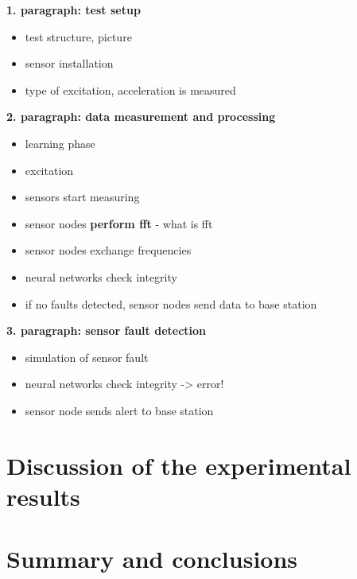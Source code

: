 \documentclass[12pt]{scrartcl}
\begin{document}
\textbf{1. paragraph: test setup}

\begin{itemize}
\item test structure, picture
\item sensor installation
\item type of excitation, acceleration is measured


\end{itemize}

\textbf{2. paragraph: data measurement and processing}

\begin{itemize}
\item learning phase
\item excitation
\item sensors start measuring
\item sensor nodes \textbf{perform fft} - what is fft
\item sensor nodes exchange frequencies
\item neural networks check integrity
\item if no faults detected, sensor nodes send data to base station
\end{itemize}

\textbf{3. paragraph: sensor fault detection}

\begin{itemize}
\item simulation of sensor fault
\item neural networks check integrity -> error!
\item sensor node sends alert to base station
\end{itemize}


\section*{Discussion of the experimental results}


\section*{Summary and conclusions}




\end{document}
